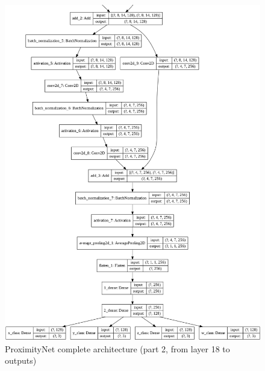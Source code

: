 \begin{figure}[!htb]
	\centering
	\includegraphics[width=1\textwidth]{"contents/images/03-proximitynet-3B"}
	\caption[ProximityNet complete architecture (part 2, from layer 18 to outputs)]{ProximityNet complete architecture (part 2, from layer 18 to outputs)}
	\label{fig:proximitynet-architecture-3b}
\end{figure}